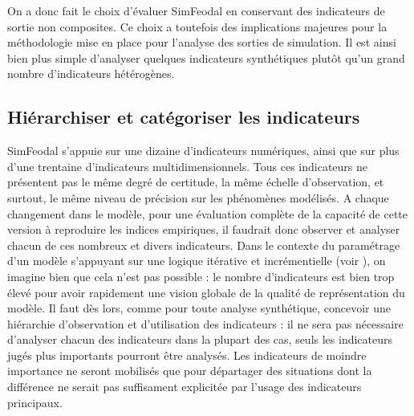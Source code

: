 On a donc fait le choix d'évaluer SimFeodal en conservant des indicateurs de sortie non composites.
Ce choix a toutefois des implications majeures pour la méthodologie mise en place pour l'analyse des sorties de simulation.
Il est ainsi bien plus simple d'analyser quelques indicateurs synthétiques plutôt qu'un grand nombre d'indicateurs hétérogènes.

\subsection{Hiérarchiser et catégoriser les indicateurs}

SimFeodal s'appuie sur une dizaine d'indicateurs numériques, ainsi que sur plus d'une trentaine d'indicateurs multidimensionnels.
Tous ces indicateurs ne présentent pas le même degré de certitude, la même échelle d'observation, et surtout, le même niveau de précision sur les phénomènes modélisés.
A chaque changement dans le modèle, pour une évaluation complète de la capacité de cette version à reproduire les indices empiriques, il faudrait donc observer et analyser chacun de ces nombreux et divers indicateurs.
Dans le contexte du paramétrage d'un modèle s'appuyant sur une logique itérative et incrémentielle (voir ), on imagine bien que cela n'est pas possible :
le nombre d'indicateurs est bien trop élevé pour avoir rapidement une vision globale de la qualité de représentation du modèle.
Il faut dès lors, comme pour toute analyse synthétique, concevoir une hiérarchie d'observation et d'utilisation des indicateurs :
il ne sera pas nécessaire d'analyser chacun des indicateurs dans la plupart des cas, seuls les indicateurs jugés plus importants pourront être analysés.
Les indicateurs de moindre importance ne seront mobilisés que pour départager des situations dont la différence ne serait pas suffisament explicitée par l'usage des indicateurs principaux.


